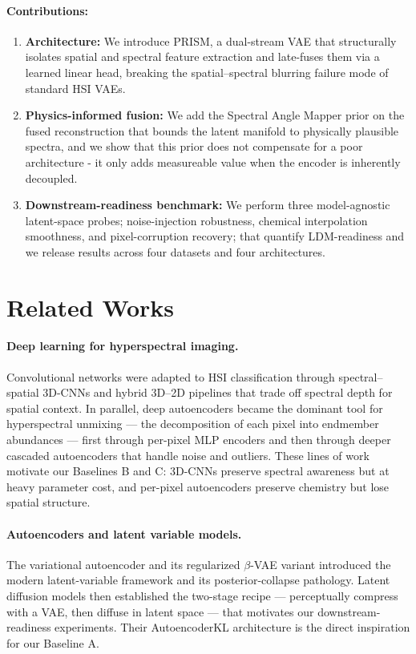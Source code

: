 \documentclass{article} %
\begin{document}
\paragraph{Contributions:}

\begin{enumerate}
\item \textbf{Architecture:} We introduce PRISM, a dual-stream VAE that structurally isolates spatial and spectral feature extraction and late-fuses them via a learned linear head, breaking the spatial--spectral blurring failure mode of standard HSI VAEs.
\item \textbf{Physics-informed fusion:} We add the Spectral Angle Mapper prior on the fused reconstruction that bounds the latent manifold to physically plausible spectra, and we show that this prior does not compensate for a poor architecture - it only adds measureable value when the encoder is inherently decoupled.
\item \textbf{Downstream-readiness benchmark:} We perform three model-agnostic latent-space probes; noise-injection robustness, chemical interpolation smoothness, and pixel-corruption recovery; that quantify LDM-readiness and we release results across four datasets and four architectures.
\end{enumerate}

\section{Related Works}

\paragraph{Deep learning for hyperspectral imaging.} Convolutional networks were adapted to HSI classification through spectral--spatial 3D-CNNs \citep{chen2016deep} and hybrid 3D--2D pipelines \citep{roy2020hybridsn} that trade off spectral depth for spatial context. In parallel, deep autoencoders became the dominant tool for hyperspectral unmixing --- the decomposition of each pixel into endmember abundances --- first through per-pixel MLP encoders \citep{palsson2018unmixing} and then through deeper cascaded autoencoders \citep{su2019daen} that handle noise and outliers. These lines of work motivate our Baselines B and C: 3D-CNNs preserve spectral awareness but at heavy parameter cost, and per-pixel autoencoders preserve chemistry but lose spatial structure.

\paragraph{Autoencoders and latent variable models.} The variational autoencoder \citep{kingma2014vae} and its regularized $\beta$-VAE variant \citep{higgins2017betavae} introduced the modern latent-variable framework and its posterior-collapse pathology. Latent diffusion models \citep{rombach2022ldm} then established the two-stage recipe --- perceptually compress with a VAE, then diffuse in latent space --- that motivates our downstream-readiness experiments. Their AutoencoderKL architecture is the direct inspiration for our Baseline A.
\end{document}
